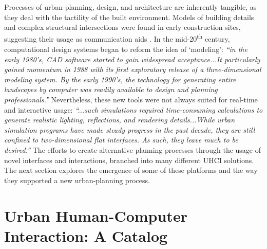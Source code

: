 {    {
        Processes of urban-planning, design, and architecture are inherently tangible, as they deal with the tactility of the built environment. Models of building details and complex structural intersections were found in early construction sites, suggesting their usage as communication aids \cite{hewitt1985representational, Noyman2015power}. In the mid-20\textsuperscript{th} century, computational design systems began to reform the idea of `modeling': \textit{``in the early 1980's, CAD software started to gain widespread acceptance...It particularly gained momentum in 1988 with its first exploratory release of a three-dimensional modeling system. By the early 1990's, the technology for generating entire landscapes by computer was readily available to design and planning professionals.''} \cite{underkoffler1997view} Nevertheless, these new tools were not always suited for real-time and interactive usage: \textit{``...such simulations required time-consuming calculations to generate realistic lighting, reflections, and rendering details...While urban simulation programs have made steady progress in the past decade, they are still confined to two-dimensional flat interfaces. As such, they leave much to be desired.''} \cite{underkoffler1997view}
    }
    \newline
    The efforts to create alternative planning processes through the usage of novel interfaces and interactions, branched into many different UHCI solutions. The next section explores the emergence of some of these platforms and the way they supported a new urban-planning process.
}


\section{Urban Human-Computer Interaction: A Catalog}\label{sec:uhci_catalog}

